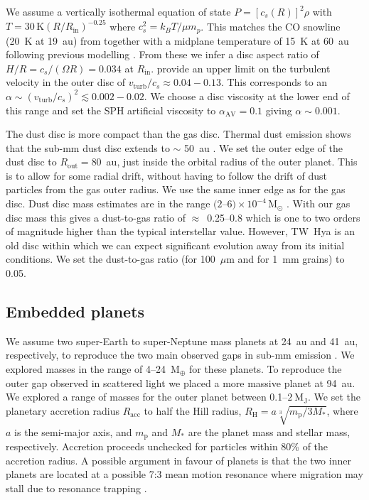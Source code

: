 \documentclass[usenatbib,a4paper,times]{mnras}
\renewcommand{\sun}{\mathrm{M}_{\odot}}
\renewcommand{\earth}{\mathrm{M}_{\oplus}}
\begin{document}
We assume a vertically isothermal equation of state $P={[c_s(R)]}^2\rho$ with $T
= 30\,\mathrm{K} {(R/R_{\mathrm{in}})}^{-0.25}$ where $c_s^2={k_B}T/\mu m_p$.
This matches the CO snowline (20~K at 19~au) from \citet{vant-hoff:2017}
together with a midplane temperature of 15~K at 60~au following previous
modelling \citep{andrews:2012}. From these we infer a disc aspect ratio of $H/R
= c_s/(\Omega R) = 0.034$ at $R_{\mathrm{in}}$. \citet{flaherty:2018} provide an
upper limit on the turbulent velocity in the outer disc of
$v_{\mathrm{turb}}/c_s\approx 0.04-0.13$. This corresponds to an $\alpha \sim
{(v_{\mathrm{turb}}/c_s)}^2 \lesssim 0.002-0.02$. We choose a disc viscosity
\citep{shakura:1973} at the lower end of this range and set the SPH artificial
viscosity to $\alpha_{\mathrm{AV}} = 0.1$ giving $\alpha \sim 0.001$.

The dust disc is more compact than the gas disc. Thermal dust emission shows
that the sub-mm dust disc extends to $\sim$ 50~au \citep{andrews:2016}. We set
the outer edge of the dust disc to $R_{\mathrm{out}}=80$~au, just inside the
orbital radius of the outer planet. This is to allow for some radial drift,
without having to follow the drift of dust particles from the gas outer radius.
We use the same inner edge as for the gas disc. Dust disc mass estimates are in
the range $(2$--$6)\times 10^{-4}\,\sun{}$ \citep{calvet:2002, thi:2010}. With
our gas disc mass this gives a dust-to-gas ratio of $\approx$~0.25--0.8 which is
one to two orders of magnitude higher than the typical interstellar value.
However, TW~Hya is an old disc within which we can expect significant evolution
away from its initial conditions. We set the dust-to-gas ratio (for 100~$\mu$m
and for 1~mm grains) to 0.05.





\subsection{Embedded planets}

We assume two super-Earth to super-Neptune mass planets at 24~au and 41~au,
respectively, to reproduce the two main observed gaps in sub-mm emission
\citep{andrews:2016}. We explored masses in the range of 4--24~$\earth{}$ for
these planets. To reproduce the outer gap observed in scattered light
\citep{van-boekel:2017} we placed a more massive planet at 94~au. We explored a
range of masses for the outer planet between 0.1--$2~\mathrm{M_J}$. We set the
planetary accretion radius $R_{\mathrm{acc}}$ to half the Hill radius,
$R_{\mathrm{H}} = a\sqrt[3]{m_{\mathrm{p}}/3M_*}$, where $a$ is the semi-major
axis, and $m_{\mathrm{p}}$ and $M_*$ are the planet mass and stellar mass,
respectively. Accretion proceeds unchecked for particles within 80\% of the
accretion radius. A possible argument in favour of planets is that the two inner
planets are located at a possible 7:3 mean motion resonance where migration may
stall due to resonance trapping \citep{terquem:2007}.
\end{document}
